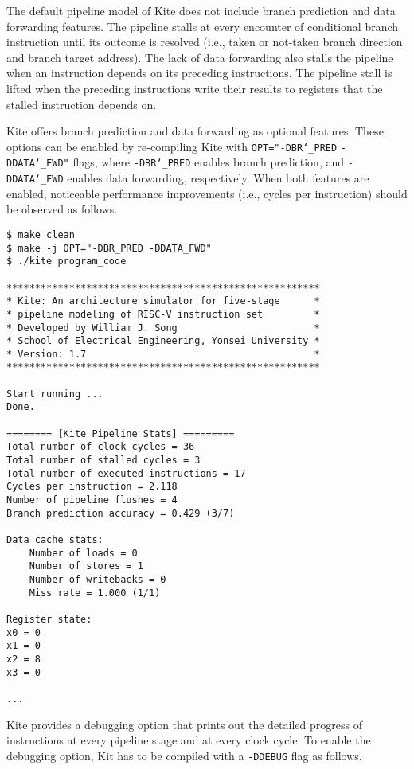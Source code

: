 \documentclass[10pt]{article}
\begin{document}
The default pipeline model of Kite does not include branch prediction and data forwarding features.
The pipeline stalls at every encounter of conditional branch instruction until its outcome is resolved (i.e., taken or not-taken branch direction and branch target address).
The lack of data forwarding also stalls the pipeline when an instruction depends on its preceding instructions.
The pipeline stall is lifted when the preceding instructions write their results to registers that the stalled instruction depends on.

Kite offers branch prediction and data forwarding as optional features.
These options can be enabled by re-compiling Kite with {\tt OPT="-DBR\char`_PRED} {\tt -DDATA\char`_FWD"} flags, where {\tt -DBR\char`_PRED} enables branch prediction, and {\tt -DDATA\char`_FWD} enables data forwarding, respectively.
When both features are enabled, noticeable performance improvements (i.e., cycles per instruction) should be observed as follows.

\begin{Verbatim}[frame=single,fontsize=\small]
$ make clean
$ make -j OPT="-DBR_PRED -DDATA_FWD"
$ ./kite program_code

*******************************************************
* Kite: An architecture simulator for five-stage      *
* pipeline modeling of RISC-V instruction set         *
* Developed by William J. Song                        *
* School of Electrical Engineering, Yonsei University *
* Version: 1.7                                        *
*******************************************************

Start running ...
Done.

======== [Kite Pipeline Stats] =========
Total number of clock cycles = 36
Total number of stalled cycles = 3
Total number of executed instructions = 17
Cycles per instruction = 2.118
Number of pipeline flushes = 4
Branch prediction accuracy = 0.429 (3/7)

Data cache stats:
    Number of loads = 0
    Number of stores = 1
    Number of writebacks = 0
    Miss rate = 1.000 (1/1)

Register state:
x0 = 0
x1 = 0
x2 = 8
x3 = 0

...

\end{Verbatim}

Kite provides a debugging option that prints out the detailed progress of instructions at every pipeline stage and at every clock cycle.
To enable the debugging option, Kit has to be compiled with a {\tt -DDEBUG} flag as follows.
\end{document}
